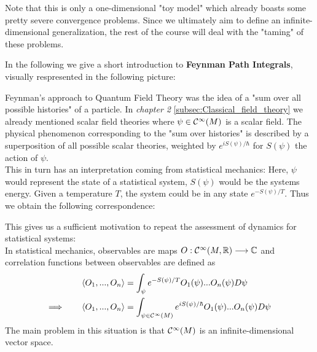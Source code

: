 \begin{example}
  Note that this is only a one-dimensional "toy model" which already boasts some pretty severe convergence problems. Since we ultimately aim to define an infinite-dimensional generalization, the rest of the course will deal with the "taming" of these problems.
\end{example}

In the following we give a short introduction to \textbf{Feynman Path Integrals}, visually respresented in the following picture:
\begin{center}
\end{center}
Feynman's approach to Quantum Field Theory was the idea of a "sum over all possible histories" of a particle. In \emph{chapter 2} \ref{subsec:Classical_field_theory} we already mentioned scalar field theories where $\psi \in\mathcal{C}^{\infty}(M)$ is a scalar field. The physical phenomenon corresponding to the "sum over histories" is described by a superposition of all possible scalar theories, weighted by $e^{iS(\psi) / \hbar}$ for $S(\psi)$ the action of $\psi$.\\

This in turn has an interpretation coming from statistical mechanics: Here, $\psi$ would represent the state of a statistical system, $S(\psi)$ would be the systems energy. Given a temperature $T$, the system could be in any state $e^{-S(\psi)/ T}$. Thus we obtain the following correspondence:
\begin{center}
\end{center}
This gives us a sufficient motivation to repeat the assessment of dynamics for statistical systems:\\

In statistical mechanics, observables are maps $O: \mathcal{C}^{\infty}(M,\mathbb{R}) \longrightarrow \mathbb{C}$ and correlation functions between observables are defined as
\begin{align*}
  \langle O_1, ..., O_n \rangle &= \int_\psi e^{-S(\psi)/T} O_1(\psi) ... O_n(\psi) D\psi\\
  \Longrightarrow \quad \quad \langle O_1, ..., O_n \rangle &= \int_{\psi \in \mathcal{C}^{\infty}(M)} e^{i S(\psi)/\hbar} O_1(\psi) ... O_n(\psi) D\psi
\end{align*}
The main problem in this situation is that $\mathcal{C}^{\infty}(M)$ is an infinite-dimensional vector space.

